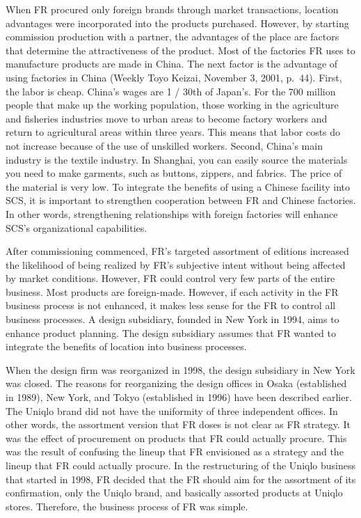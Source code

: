 \documentclass[12pt,a4paper]{article}
\begin{document}
When FR procured only foreign brands through market transactions,
location advantages were incorporated into the products purchased.
However, by starting commission production with a partner, the
advantages of the place are factors that determine the attractiveness of
the product. Most of the factories FR uses to manufacture products are
made in China. The next factor is the advantage of using factories in
China (Weekly Toyo Keizai, November 3, 2001, p.~44). First, the labor is
cheap. China's wages are 1 / 30th of Japan's. For the 700 million people
that make up the working population, those working in the agriculture
and fisheries industries move to urban areas to become factory workers
and return to agricultural areas within three years. This means that
labor costs do not increase because of the use of unskilled workers.
Second, China's main industry is the textile industry. In Shanghai, you
can easily source the materials you need to make garments, such as
buttons, zippers, and fabrics. The price of the material is very low. To
integrate the benefits of using a Chinese facility into SCS, it is
important to strengthen cooperation between FR and Chinese factories. In
other words, strengthening relationships with foreign factories will
enhance SCS's organizational capabilities.

After commissioning commenced, FR's targeted assortment of editions
increased the likelihood of being realized by FR's subjective intent
without being affected by market conditions. However, FR could control
very few parts of the entire business. Most products are foreign-made.
However, if each activity in the FR business process is not enhanced, it
makes less sense for the FR to control all business processes. A design
subsidiary, founded in New York in 1994, aims to enhance product
planning. The design subsidiary assumes that FR wanted to integrate the
benefits of location into business processes.

When the design firm was reorganized in 1998, the design subsidiary in
New York was closed. The reasons for reorganizing the design offices in
Osaka (established in 1989), New York, and Tokyo (established in 1996)
have been described earlier. The Uniqlo brand did not have the
uniformity of three independent offices. In other words, the assortment
version that FR doses is not clear as FR strategy. It was the effect of
procurement on products that FR could actually procure. This was the
result of confusing the lineup that FR envisioned as a strategy and the
lineup that FR could actually procure. In the restructuring of the
Uniqlo business that started in 1998, FR decided that the FR should aim
for the assortment of its confirmation, only the Uniqlo brand, and
basically assorted products at Uniqlo stores. Therefore, the business
process of FR was simple.
\end{document}

